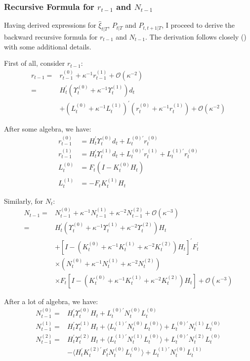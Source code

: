 \documentclass[10pt, titlepage]{article}
\numberwithin{equation}{section}
\begin{document}
\subsubsection{Recursive Formula for \texorpdfstring{$r_{t-1}$}{} and \texorpdfstring{$N_{t-1}$}{}} \label{ap:r_N}
Having derived expressions for $\hat{\xi}_{t|T}$, $P_{t|T}$ and $P_{t,t+1|T}$, I proceed to derive the backward recursive formula for $r_{t-1}$ and $N_{t-1}$. The derivation follows closely (\cite{durbin_koopman_2003}) with some additional details. 

First of all, consider $r_{t-1}$:
\begin{align*}
    r_{t-1} =& r_{t-1}^{(0)} + \kappa^{-1}r_{t-1}^{(1)} + \mathcal{O}(\kappa^{-2}) \\
    =& H_t^{'}(\Upsilon_t^{(0)}+ \kappa^{-1}\Upsilon_t^{(1)})d_t \\
    &+ (L_t^{(0)} + \kappa^{-1}L_t^{(1)})^{'}(r_t^{(0)}+\kappa^{-1}r_t^{(1)}) + \mathcal{O}(\kappa^{-2})
\end{align*}

After some algebra, we have:
\begin{align*}
    r_{t-1}^{(0)} &= H_t^{'}\Upsilon_t^{(0)}d_t + L_t^{(0)'}r_t^{(0)} \\
    r_{t-1}^{(1)} &= H_t^{'}\Upsilon_t^{(1)}d_t+L_t^{(0)'}r_t^{(1)} + L_t^{(1)'}r_t^{(0)} \\
    L_t^{(0)} &= F_t(I-K_t^{(0)}H_t) \\
    L_t^{(1)} &= -F_tK_t^{(1)}H_t 
\end{align*}

Similarly, for $N_t$:
\begin{align*}
    N_{t-1} =& N_{t-1}^{(0)} + \kappa^{-1}N_{t-1}^{(1)} + \kappa^{-2}N_{t-1}^{(2)} + \mathcal{O}(\kappa^{-3}) \\
    =& H_t^{'}(\Upsilon_t^{(0)}+\kappa^{-1}\Upsilon_t^{(1)}+\kappa^{-2}\Upsilon_t^{(2)})H_t \\
    &+[I-(K_t^{(0)}+\kappa^{-1}K_t^{(1)}+\kappa^{-2}K_t^{(2)})H_t]^{'}F_t^{'} \\
    &\times(N_t^{(0)}+\kappa^{-1}N_t^{(1)}+\kappa^{-2}N_t^{(2)}) \\
    &\times F_t[I-(K_t^{(0)}+\kappa^{-1}K_t^{(1)}+\kappa^{-2}K_t^{(2)})H_t] + \mathcal{O}(\kappa^{-3})
\end{align*}

After a lot of algebra, we have:
\begin{align*}
    N_{t-1}^{(0)} =& H_t^{'}\Upsilon_t^{(0)}H_t + L_t^{(0)'}N_t^{(0)}L_t^{(0)} \\
    N_{t-1}^{(1)} =& H_t^{'}\Upsilon_t^{(1)}H_t + \langle L_t^{(1)'}N_t^{(0)}L_t^{(0)}\rangle + L_t^{(0)'}N_t^{(1)}L_t^{(0)} \\
    N_{t-1}^{(2)} =& H_t^{'}\Upsilon_t^{(2)}H_t + \langle L_t^{(1)'}N_t^{(1)}L_t^{(0)}\rangle + L_t^{(0)'}N_t^{(2)}L_t^{(0)} \\
    &- \langle H_t^{'}K_t^{(2)'}F_t^{'}N_t^{(0)}L_t^{(0)}\rangle +  L_t^{(1)'}N_t^{(0)}L_t^{(1)}
\end{align*}
\end{document}

